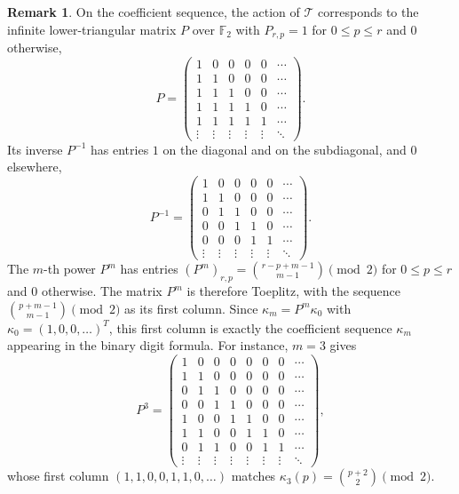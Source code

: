 \documentclass[12pt,reqno]{article}
\theoremstyle{plain}
\theoremstyle{definition}
\newtheorem{remark}[theorem]{Remark}
\begin{document}
\begin{remark}
On the coefficient sequence, the action of $\mathcal{T}$ corresponds to the infinite lower-triangular matrix $P$ over $\mathbb{F}_2$ with $P_{r,p} = 1$ for $0 \le p \le r$ and $0$ otherwise,
\[
P =
\begin{pmatrix}
1 & 0 & 0 & 0 & 0 & \cdots \\
1 & 1 & 0 & 0 & 0 & \cdots \\
1 & 1 & 1 & 0 & 0 & \cdots \\
1 & 1 & 1 & 1 & 0 & \cdots \\
1 & 1 & 1 & 1 & 1 & \cdots \\
\vdots & \vdots & \vdots & \vdots & \vdots & \ddots
\end{pmatrix}.
\]
Its inverse $P^{-1}$ has entries $1$ on the diagonal and on the subdiagonal, and $0$ elsewhere,
\[
P^{-1} =
\begin{pmatrix}
1 & 0 & 0 & 0 & 0 & \cdots \\
1 & 1 & 0 & 0 & 0 & \cdots \\
0 & 1 & 1 & 0 & 0 & \cdots \\
0 & 0 & 1 & 1 & 0 & \cdots \\
0 & 0 & 0 & 1 & 1 & \cdots \\
\vdots & \vdots & \vdots & \vdots & \vdots & \ddots
\end{pmatrix}.
\]
The $m$-th power $P^m$ has entries $(P^m)_{r,p} = \binom{r-p+m-1}{m-1} \pmod 2$ for $0 \le p \le r$ and $0$ otherwise. The matrix $P^m$ is therefore Toeplitz, with the sequence $\binom{p+m-1}{m-1} \pmod 2$ as its first column. Since $\kappa_m = P^m \kappa_0$ with $\kappa_0 = (1, 0, 0, \dots)^T$, this first column is exactly the coefficient sequence $\kappa_m$ appearing in the binary digit formula. For instance, $m = 3$ gives
\[
P^3 =
\begin{pmatrix}
1 & 0 & 0 & 0 & 0 & 0 & 0 & \cdots \\
1 & 1 & 0 & 0 & 0 & 0 & 0 & \cdots \\
0 & 1 & 1 & 0 & 0 & 0 & 0 & \cdots \\
0 & 0 & 1 & 1 & 0 & 0 & 0 & \cdots \\
1 & 0 & 0 & 1 & 1 & 0 & 0 & \cdots \\
1 & 1 & 0 & 0 & 1 & 1 & 0 & \cdots \\
0 & 1 & 1 & 0 & 0 & 1 & 1 & \cdots \\
\vdots & \vdots & \vdots & \vdots & \vdots & \vdots & \vdots & \ddots
\end{pmatrix},
\]
whose first column $(1, 1, 0, 0, 1, 1, 0, \dots)$ matches $\kappa_3(p) = \binom{p+2}{2} \pmod 2$.
\end{remark}
\end{document}
